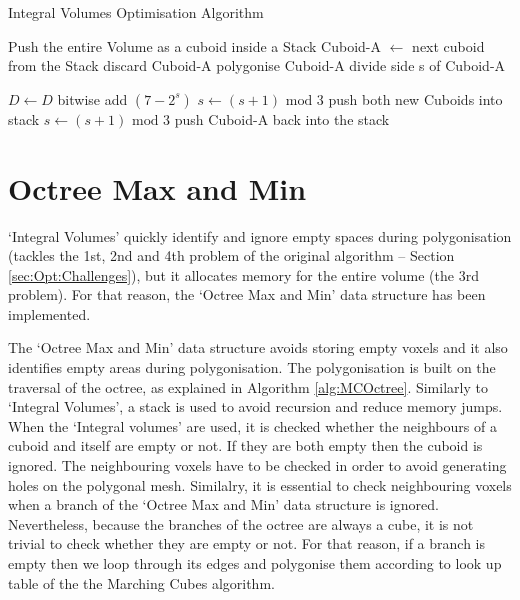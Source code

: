 \documentclass{subfiles}
\begin{document}
\begin{algorithm}[!htbp]
	\caption{Integral Volumes Optimisation Algorithm}
	\label{alg:IVoptAdvance}
	\centering
	\begin{algorithmic}[1]
		\State Push the entire Volume as a cuboid inside a Stack
			\State Cuboid-A   $\gets$  next cuboid from the Stack 
				\State	discard Cuboid-A
				\State polygonise Cuboid-A
				\State	divide side s of Cuboid-A 
		
					\State	$D \gets D$ bitwise add $(7-2^s)$
				\EndIf
				\State 	$s \gets (s+1) \text{ mod } 3$
				\State push both new Cuboids into stack
			\Else 
				\State $s \gets (s+1) \text{ mod } 3$
				\State push Cuboid-A back into the stack
			\EndIf
		\EndWhile
	\end{algorithmic}
\end{algorithm}

\newpage

\rhead{ }
\section{Octree Max and Min} \label{sec:OctreeMaxMin}

\par `Integral Volumes' quickly identify and ignore empty spaces during polygonisation (tackles the 1st, 2nd and 4th problem of the original algorithm -- Section \ref{sec:Opt:Challenges}), but it allocates memory for the entire volume (the 3rd problem). For that reason, the `Octree Max and Min' data structure has been implemented. 

\par The `Octree Max and Min' data structure avoids storing empty voxels and it also identifies empty areas during polygonisation. The polygonisation is built on the traversal of the octree, as explained in Algorithm \ref{alg:MCOctree}. Similarly to `Integral Volumes', a stack is used to avoid recursion and reduce memory jumps. When the `Integral volumes' are used, it is checked whether the neighbours of a cuboid and itself are empty or not. If they are both empty then the cuboid is ignored. The neighbouring voxels have to be checked in order to avoid generating holes on the polygonal mesh. Similalry, it is essential to check neighbouring voxels when a branch of the `Octree Max and Min' data structure is ignored. Nevertheless, because the branches of the octree are always a cube, it is not trivial to check whether they are empty or not. For that reason, if a branch is empty then we loop through its edges and polygonise them according to look up table of the the Marching Cubes algorithm. 
\end{document}
